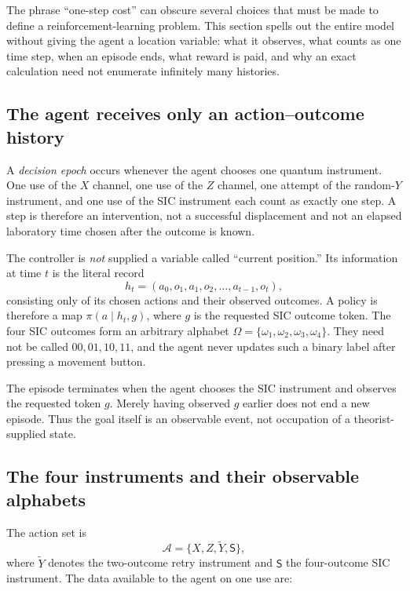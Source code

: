 \documentclass[11pt]{article}
\theoremstyle{definition}
\theoremstyle{remark}
\begin{document}
The phrase ``one-step cost'' can obscure several choices that must be made to
define a reinforcement-learning problem. This section spells out the entire
model without giving the agent a location variable: what it observes, what
counts as one time step, when an episode ends, what reward is paid, and why an
exact calculation need not enumerate infinitely many histories.

\subsection{The agent receives only an action--outcome history}

A \emph{decision epoch} occurs whenever the agent chooses one quantum
instrument. One use of the \(X\) channel, one use of the \(Z\) channel, one
attempt of the random-\(Y\) instrument, and one use of the SIC instrument each
count as exactly one step. A step is therefore an intervention, not a
successful displacement and not an elapsed laboratory time chosen after the
outcome is known.

The controller is \emph{not} supplied a variable called ``current position.''
Its information at time \(t\) is the literal record
\[
 h_t=(a_0,o_1,a_1,o_2,\ldots,a_{t-1},o_t),
\]
consisting only of its chosen actions and their observed outcomes.  A policy
is therefore a map \(\pi(a\mid h_t,g)\), where \(g\) is the requested SIC
outcome token.  The four SIC outcomes form an arbitrary alphabet
\(\Omega=\{\omega_1,\omega_2,\omega_3,\omega_4\}\).  They need not be called
\(00,01,10,11\), and the agent never updates such a binary label after
pressing a movement button.

The episode terminates when the agent chooses the SIC instrument and observes
the requested token \(g\).  Merely having observed \(g\) earlier does not end
a new episode.  Thus the goal itself is an observable event, not occupation
of a theorist-supplied state.

\subsection{The four instruments and their observable alphabets}

The action set is
\[
 \mathcal A=\{X,Z,\widetilde Y,\mathsf S\},
\]
where \(\widetilde Y\) denotes the two-outcome retry instrument and
\(\mathsf S\) the four-outcome SIC instrument.  The data available to the
agent on one use are:
\end{document}
